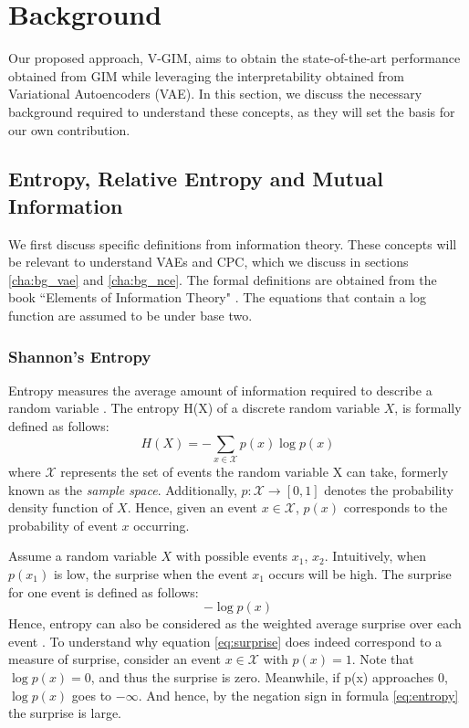 
\chapter{Background} \label{cha:2}

Our proposed approach, V-GIM, aims to obtain the state-of-the-art performance obtained from GIM while leveraging the interpretability obtained from Variational Autoencoders (VAE). In this section, we discuss the necessary background required to understand these concepts, as they will set the basis for our own contribution.



\section{Entropy, Relative Entropy and Mutual Information}
We first discuss specific definitions from information theory. These concepts will be relevant to understand VAEs and CPC, which we discuss in sections \ref{cha:bg_vae} and \ref{cha:bg_nce}. The formal definitions are obtained from the book ``Elements of Information Theory" \citep{coverElementsInformationTheory2006}. The equations that contain a log function are assumed to be under base two.

\subsection{Shannon's Entropy}
Entropy measures the average amount of information required to describe a random variable \citep{coverElementsInformationTheory2006}. The entropy H(X) of a discrete random variable $X$, is formally defined as follows: 
\begin{equation}
	H(X) = -\sum_{x\in\mathcal{X}} p(x) \log p(x)  \label{eq:entropy}
\end{equation}
where $\mathcal{X}$ represents the set of events the random variable X can take, formerly known as the \textit{sample space}. Additionally, $p: \mathcal{X} \rightarrow [0, 1]$ denotes the probability density function of $X$. Hence, given an event $ x \in \mathcal{X}$, $p(x)$ corresponds to the probability of event $x$ occurring.

Assume a random variable $X$ with possible events $x_1$, $x_2$. Intuitively, when $p(x_1)$ is low, the surprise when the event $x_1$ occurs will be high. The surprise for one event is defined as follows:
\begin{equation}
	- \log p(x) \label{eq:surprise}
\end{equation}
Hence, entropy can also be considered as the weighted average surprise over each event \citep{datasciencecoursesAliGhodsiLec2017}. 
To understand why equation \ref{eq:surprise} does indeed correspond to a measure of surprise, consider an event $x \in \mathcal{X}$ with $p(x) = 1$. Note that $\log p(x) = 0$, and thus the surprise is zero. Meanwhile, if p(x) approaches $0$, $\log p(x)$ goes to $- \infty$. And hence, by the negation sign in formula \ref{eq:entropy} the surprise is large.


